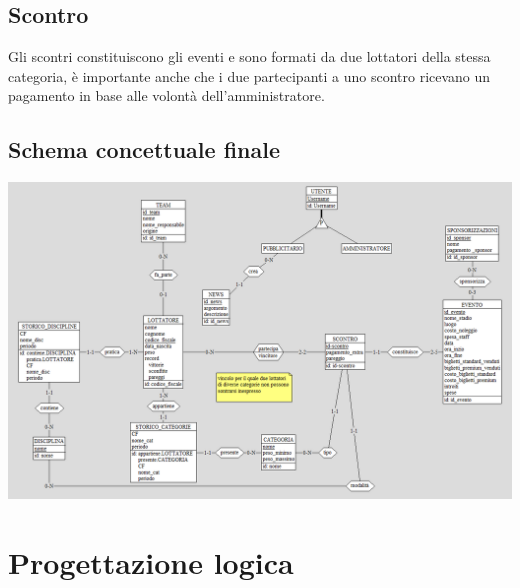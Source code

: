 \documentclass[a4paper,12pt]{report}
\begin{document}
\section{Scontro}
Gli scontri constituiscono gli eventi e sono formati da due lottatori della stessa categoria, è importante anche che i due partecipanti 
a uno scontro ricevano un pagamento in base alle volontà dell'amministratore.

\section{Schema concettuale finale}
\includegraphics[scale=0.7, angle=90]{./img/schema_finale.png}

\chapter{Progettazione logica}
\end{document}
